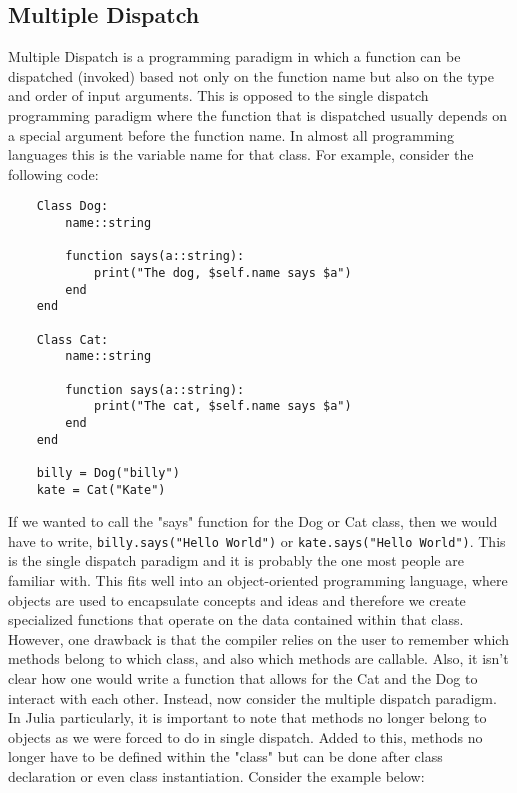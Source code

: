 \subsection{Multiple Dispatch}
Multiple Dispatch is a programming paradigm in which a function can be dispatched (invoked) based not only on the
function name but also on the type and order of input arguments. This is opposed to the single dispatch
programming paradigm where the function that is dispatched usually depends on a special argument before the function
name. In almost all programming languages this is the variable name for that class. For example, consider the following
code: \hfill
\begin{lstlisting}
    Class Dog:
        name::string

        function says(a::string):
            print("The dog, $self.name says $a")
        end
    end

    Class Cat:
        name::string

        function says(a::string):
            print("The cat, $self.name says $a")
        end
    end

    billy = Dog("billy")
    kate = Cat("Kate")
\end{lstlisting}
If we wanted to call the "says" function for the Dog or Cat class, then we would have to write,
\lstinline|billy.says("Hello World")| or \lstinline|kate.says("Hello World")|. This is the single dispatch paradigm and
it is probably the one most people are familiar with. This fits well into an object-oriented programming language, where
objects are used to encapsulate concepts and ideas and therefore we create specialized functions that operate on the data
contained within that class. However, one drawback is that the compiler relies on the user to remember which
methods belong to which class, and also which methods are callable. Also, it isn't clear how one would write a function
that allows for the Cat and the Dog to interact with each other. Instead, now consider the multiple dispatch paradigm.
In Julia particularly, it is important to note that methods no longer belong to objects as we were forced to do in
single dispatch. Added to this, methods no longer have to be defined within the "class" but can be done after class
declaration or even class instantiation. Consider the example below: \hfill

